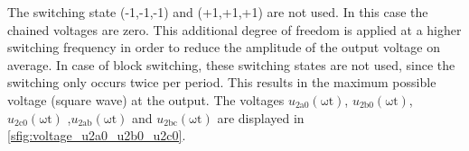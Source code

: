 \begin{solutionblock}
\begin{minipage}{0.55\textwidth}
    \end{minipage}
    \bigskip
    \FloatBarrier
    The switching state (-1,-1,-1) and (+1,+1,+1) are not used. In this case the chained voltages are zero. 
    This additional degree of freedom is applied at a higher switching frequency in order to reduce the amplitude of the
    output voltage on average. In case of block switching, these switching states are not used, since
    the switching only occurs twice per period. This results in the maximum possible voltage (square wave) at the output.
    The voltages $u_\mathrm{2a0}(\mathrm{\omega t})$, $u_\mathrm{2b0}(\mathrm{\omega t})$, $u_\mathrm{2c0}(\mathrm{\omega t})$ ,$u_\mathrm{2ab}(\mathrm{\omega t})$ and $u_\mathrm{2bc}(\mathrm{\omega t})$ are displayed in \autoref{sfig:voltage_u2a0_u2b0_u2c0}.

    
\end{solutionblock}

